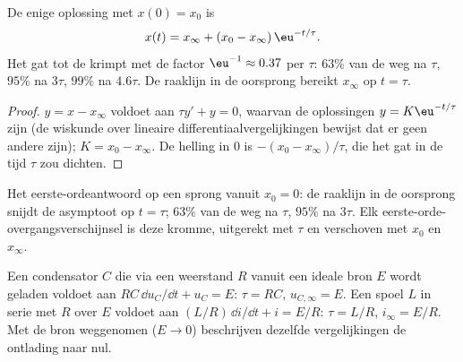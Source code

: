 \begin{theorem}[Oplossing]\label{thm:b1:transient-regimes:firstorder}
De enige oplossing met $x(0) = x_0$ is
\[
x(t) = x_\infty + (x_0 - x_\infty)\,\eu^{-t/\tau} .
\]
Het gat tot de  krimpt met de factor $\eu^{-1} \approx
0.37$ per $\tau$: $63\%$ van de weg na $\tau$, $95\%$ na $3\tau$,
$99\%$ na $4.6\tau$. De raaklijn in de oorsprong bereikt $x_\infty$ op
$t = \tau$.
\end{theorem}

\begin{proof}
$y = x - x_\infty$ voldoet aan $\tau y' + y = 0$, waarvan de oplossingen
$y = K\eu^{-t/\tau}$ zijn (de wiskunde over lineaire
differentiaalvergelijkingen bewijst dat er geen andere zijn); $K = x_0 - x_\infty$. De helling
in $0$ is $-(x_0 - x_\infty)/\tau$, die het gat in de tijd
$\tau$ zou dichten.
\end{proof}

\begin{omfigure}

{\small Het eerste-ordeantwoord op een sprong vanuit $x_0 = 0$: de
raaklijn in de oorsprong snijdt de asymptoot op $t = \tau$; $63\%$ van de weg na $\tau$,
$95\%$ na $3\tau$. Elk eerste-orde-overgangsverschijnsel is deze kromme, uitgerekt
met $\tau$ en verschoven met $x_0$ en $x_\infty$.}
\end{omfigure}

\begin{proposition}[RC- en RL-kringen]\label{prop:b1:transient-regimes:rcrl}
Een condensator $C$ die via een weerstand $R$ vanuit een ideale bron $E$ wordt
geladen voldoet aan $RC\,\dd u_C/\dd t + u_C = E$: $\tau = RC$, $u_{C,\infty} = E$. Een
spoel $L$ in serie met $R$ over $E$ voldoet aan $(L/R)\,\dd i/\dd t + i =
E/R$: $\tau = L/R$, $i_\infty = E/R$. Met de bron weggenomen
($E \to 0$) beschrijven dezelfde vergelijkingen de ontlading naar nul.
\end{proposition}

